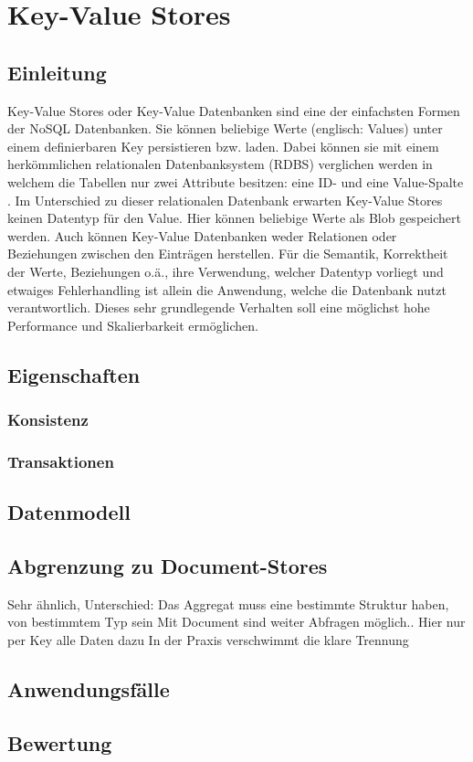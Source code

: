 \section{Key-Value Stores}
\subsection{Einleitung}
Key-Value Stores oder Key-Value Datenbanken sind eine der einfachsten Formen der NoSQL Datenbanken. Sie können beliebige Werte (englisch: Values) unter einem definierbaren Key persistieren bzw. laden. Dabei können sie mit einem herkömmlichen relationalen Datenbanksystem (RDBS) verglichen werden in welchem die Tabellen nur zwei Attribute besitzen: eine ID- und eine Value-Spalte \cite{sadalage01}. Im Unterschied zu dieser relationalen Datenbank erwarten Key-Value Stores keinen Datentyp für den Value. Hier können beliebige Werte als Blob gespeichert werden. Auch können Key-Value Datenbanken weder Relationen oder Beziehungen zwischen den Einträgen herstellen. Für die Semantik, Korrektheit der Werte, Beziehungen o.ä., ihre Verwendung, welcher Datentyp vorliegt und etwaiges Fehlerhandling ist allein die Anwendung, welche die Datenbank nutzt verantwortlich. Dieses sehr grundlegende Verhalten soll eine möglichst hohe Performance und Skalierbarkeit ermöglichen. 

\subsection{Eigenschaften}

\subsubsection{Konsistenz}

\subsubsection{Transaktionen}

\subsection{Datenmodell}

\subsection{Abgrenzung zu Document-Stores}
Sehr ähnlich, Unterschied: Das Aggregat muss eine bestimmte Struktur haben, von bestimmtem Typ sein
Mit Document sind weiter Abfragen möglich.. Hier nur per Key alle Daten dazu
In der Praxis verschwimmt die klare Trennung

\subsection{Anwendungsfälle}

\subsection{Bewertung}

